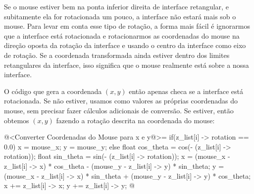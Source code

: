 Se o mouse estiver bem na ponta inferior direita de interface
retangular, e subitamente ela for rotacionada um pouco, a interface
não estará mais sob o mouse. Para levar em conta esse tipo de rotação,
a forma mais fácil é ignorarmos que a interface está rotacionada e
rotacionarmos as coordenadas do mouse na direção oposta da rotação da
interface e usando o centro da interface como eixo de rotação. Se a
coordenada transformada ainda estiver dentro dos limites retangulares
da interface, isso significa que o mouse realmente está sobre a nossa
interface.

O código que gera a coordenada $(x, y)$ então apenas checa se a
interface está rotacionada. Se não estiver, usamos como valores as
próprias coordenadas do mouse, sem precisar fazer cálculos adicionais
de conversão. Se estiver, então obtemos $(x, y)$ fazendo a rotação
descrita na coordenada do mouse:

\iniciocodigo
@<Converter Coordenadas do Mouse para x e y@>=
if(z_list[i] -> rotation == 0.0){
  x = mouse_x;
  y = mouse_y;
}
else{
 float cos_theta = cos(- (z_list[i] -> rotation));
 float sin_theta = sin(- (z_list[i] -> rotation));
 x = (mouse_x - z_list[i] -> x) * cos_theta -
       (mouse_y - z_list[i] -> y) * sin_theta;
 y = (mouse_x - z_list[i] -> x) * sin_theta +
       (mouse_y - z_list[i] -> y) * cos_theta;
 x +=  z_list[i] -> x;
 y +=  z_list[i] -> y;
}
@
\fimcodigo






\fim
